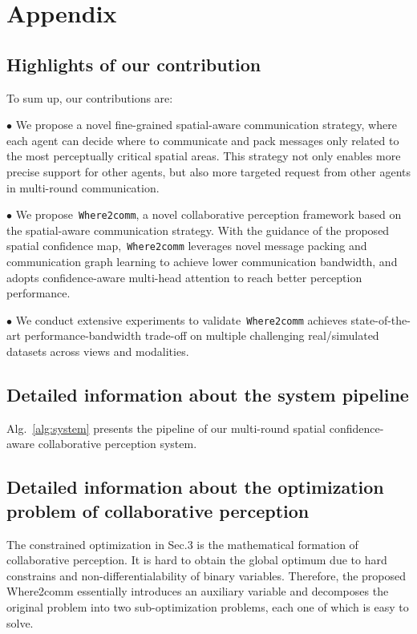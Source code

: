 \documentclass{article}
\begin{document}
\section{Appendix}

\subsection{Highlights of our contribution}
To sum up, our contributions are:

$\bullet$ We propose a novel fine-grained spatial-aware communication strategy, where each agent can decide where to communicate and pack messages only related to the most perceptually critical spatial areas. This strategy not only enables more precise support for other agents, but also more targeted request from other agents in multi-round communication.

$\bullet$ We propose~\texttt{Where2comm}, a novel collaborative perception framework based on the spatial-aware communication strategy. With the guidance of the proposed spatial confidence map,~\texttt{Where2comm} leverages novel message packing and communication graph learning to  achieve lower communication bandwidth, and adopts confidence-aware multi-head attention to reach better perception performance.

$\bullet$ We conduct extensive experiments to validate~\texttt{Where2comm} achieves state-of-the-art performance-bandwidth trade-off on multiple challenging real/simulated datasets across views and modalities. 


\subsection{Detailed information about the system pipeline}
Alg.~\ref{alg:system} presents the pipeline of our multi-round spatial confidence-aware collaborative perception system.


\subsection{Detailed information about the optimization problem of collaborative perception}
The constrained optimization in Sec.3 is the mathematical formation of collaborative perception. It is hard to obtain the global optimum due to hard constrains and non-differentialability of binary variables. Therefore, the proposed Where2comm essentially introduces an auxiliary variable and decomposes the original problem into two sub-optimization problems, each one of which is easy to solve.
\end{document}
